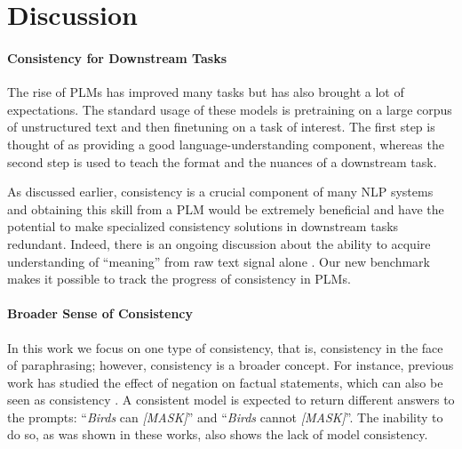 \section{Discussion}
\label{sec:discussion}

\paragraph{Consistency for Downstream Tasks}

The rise of PLMs has improved many tasks but has also brought a lot of expectations. The standard usage of these models is pretraining on a large corpus of unstructured text and then finetuning on a task of interest. The first step is thought of as providing a good language-understanding component, whereas the second step is used to teach the format and the nuances of a downstream task.

As discussed earlier, consistency is a crucial component of many NLP systems \cite{du2019consistent,consistent-qa,denis2009global,kryscinski2020evaluating} and obtaining this skill from a PLM would be extremely beneficial and have the potential to make specialized consistency solutions in downstream tasks redundant.
Indeed, there is an ongoing discussion about the ability to acquire understanding of ``meaning'' from raw text signal alone \cite{bender2020climbing}.
Our new benchmark makes it possible to track the progress of consistency in PLMs.


\paragraph{Broader Sense of Consistency}
In this work we focus on one type of consistency, that is,
consistency in the face of paraphrasing; however, consistency is
a broader concept.  For instance, previous work has studied
the effect of negation on factual statements, which can also
be seen as consistency
\cite{Ettinger_2020,kassner-schutze-2020-negated}. 
A consistent model is expected to return  different answers
to the prompts: ``\textit{Birds} can \textit{[MASK]}'' and
``\textit{Birds} cannot \textit{[MASK]}''. The inability to
do so, as was shown in these works, also shows the lack of
model consistency.


